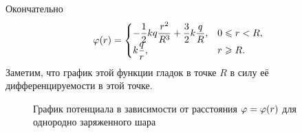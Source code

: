 	Окончательно
	\begin{equation}
		\varphi(r)=\begin{cases}
						-\dfrac{1}{2}kq\dfrac{r^2}{R^3}+\dfrac{3}{2}k\dfrac{q}{R},& \text{$0\leqslant r<R$},\\
						k\dfrac{q}{r},& \text{$r\geqslant R$}.
					\end{cases}
	\end{equation}
	Заметим, что график этой функции гладок в точке $R$ в силу её дифференцируемости в этой точке. 
	\begin{figure}[t]
		\centering
		
		\caption{График потенциала в зависимости от расстояния $\varphi\hm{=}\varphi(r)$ для однородно заряженного шара}
	\end{figure}